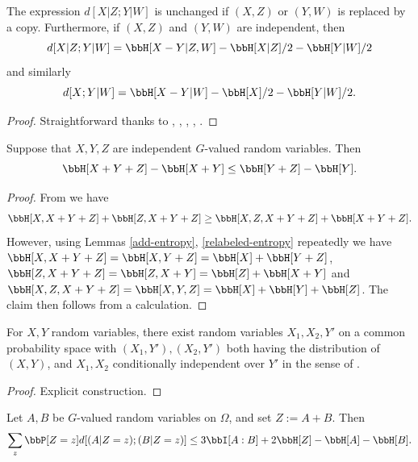 \begin{lemma}\label{cond-dist-alt}
\leanok
  The expression $d[X  | Z;Y | W]$ is unchanged if $(X,Z)$ or $(Y,W)$ is replaced by a copy.  Furthermore, if $(X,Z)$ and $(Y,W)$ are independent, then
$$  d[X  | Z;Y | W] = \bbH[X-Y|Z,W] - \bbH[X|Z]/2 - \bbH[Y|W]/2$$
and similarly
$$  d[X ;Y | W] = \bbH[X-Y|W] - \bbH[X]/2 - \bbH[Y|W]/2.$$
\end{lemma}

\begin{proof}\leanok Straightforward thanks to , , , , .
\end{proof}

\begin{lemma}\label{kv}
  \leanok
Suppose that $X, Y, Z$ are independent $G$-valued random variables. Then
\[
  \bbH[X + Y + Z] - \bbH[X + Y] \leq \bbH[Y+ Z] - \bbH[Y].
\]
\end{lemma}

\begin{proof}\leanok
From  we have
$$ \bbH[X, X + Y+ Z] + \bbH[Z, X + Y+ Z] \geq \bbH[X, Z, X + Y+ Z] + \bbH[X + Y+ Z].$$
However, using Lemmas \ref{add-entropy}, \ref{relabeled-entropy} repeatedly we have $\bbH[X, X + Y+ Z] = \bbH[X, Y+ Z] = \bbH[X] + \bbH[Y+ Z]$, $\bbH[Z, X + Y + Z] = \bbH[Z, X + Y] = \bbH[Z] + \bbH[X + Y]$ and $\bbH[X, Z, X + Y+ Z] = \bbH[X, Y, Z] = \bbH[X] + \bbH[Y] + \bbH[Z]$.  The claim then follows from a calculation.
\end{proof}

\begin{lemma}\label{cond-indep-exist}
  \leanok
  For $X,Y$ random variables, there exist random variables $X_1,X_2,Y'$ on a common probability space with $(X_1, Y'), (X_2, Y')$ both having the distribution of $(X,Y)$, and $X_1, X_2$ conditionally independent over $Y'$ in the sense of .
\end{lemma}

\begin{proof}\leanok Explicit construction.
\end{proof}


\begin{lemma}\label{entropic-bsg}
  \leanok
  Let $A,B$ be $G$-valued random variables on $\Omega$, and set $Z := A+B$.
Then
\begin{equation}\label{2-bsg-takeaway} \sum_{z}  \bbP[Z=z] d[(A | Z = z); (B | Z = z)] \leq 3  \bbI[A:B] + 2 \bbH[Z] - \bbH[A] - \bbH[B]. \end{equation}
\end{lemma}

